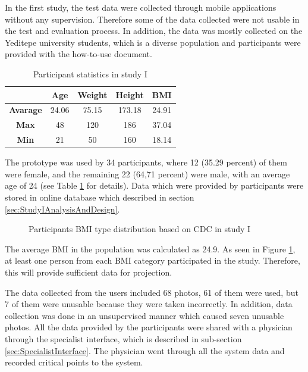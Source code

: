 In the first study, the test data were collected through mobile applications without any supervision. Therefore some of the data collected were not usable in the test and evaluation process. In addition, the data was mostly collected on the Yeditepe university students, which is a diverse population and participants were provided with the how-to-use document.

\begin{table}[htbp]
\begin{center}
\caption{Participant statistics in study I}
\vspace{23pt}
      \begin{tabular}{|c|c|c|c|c|} \hline
          & \textbf{Age} & \textbf{Weight} & \textbf{Height} & \textbf{BMI} \\ \hline
        \textbf{Avarage} & 24.06 & 75.15 & 173.18 & 24.91 \\ \hline
        \textbf{Max} & 48 & 120 & 186 & 37.04 \\ \hline
        \textbf{Min} & 21 & 50 & 160 & 18.14 \\ \hline
    \end{tabular}
\label{tab:StudyIParticipantStatistics}
\end{center}
\end{table}

The prototype was used by 34 participants, where 12 (35.29 percent) of them were female, and the remaining 22 (64,71 percent) were male, with an average age of 24 (see Table \ref{tab:StudyIParticipantStatistics} for details). Data which were provided by participants were stored in online database which described in section \ref{sec:StudyIAnalysisAndDesign}. 

\begin{figure}[htbp]
\centering
{}
\caption{Participants BMI type distribution based on CDC in study I}
\label{fig:StudyIParticipantsBMITypeDistribution}
\end{figure}

The average BMI in the population was calculated as 24.9. As seen in Figure \ref{fig:StudyIParticipantsBMITypeDistribution}, at least one person from each BMI category participated in the study. Therefore, this will provide sufficient data for projection.

The data collected from the users included 68 photos, 61 of them were used, but 7 of them were unusable because they were taken incorrectly. In addition, data collection was done in an unsupervised manner which caused seven unusable photos. All the data provided by the participants were shared with a physician through the specialist interface, which is described in sub-section \ref{sec:SpecialistInterface}. The physician went through all the system data and recorded critical points to the system.

